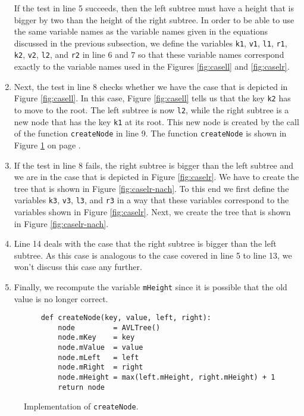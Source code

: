 \begin{enumerate}
      If the test in line 5 succeeds, then the left subtree must have a height that is bigger by
      two than the height of the right subtree.  In order to be able to use the same variable names 
      as the variable names given in the equations discussed in the previous subsection, we define
      the variables \texttt{k1}, \texttt{v1}, \texttt{l1}, \texttt{r1}, \texttt{k2}, \texttt{v2}, \texttt{l2},
      and \texttt{r2} in line 6 and 7 so that these variable names correspond exactly to the variable names
      used in the Figures \ref{fig:casell} and \ref{fig:caselr}.
\item Next, the test in line 8 checks whether we have the case that is depicted in Figure
      \ref{fig:casell}.  In this case, Figure \ref{fig:casell} tells us that the key \texttt{k2}
      has to move to the root.  The left subtree is now \texttt{l2}, while the right subtree is a
      new node that has the key \texttt{k1} at its root.  This new node is created by the call
      of the function \texttt{createNode} in line 9.  The function \texttt{createNode} is shown in
      Figure \ref{fig:avl-tree.ipython:createNode} on page \pageref{fig:avl-tree.ipython:createNode}.
\item If the test in line 8 fails, the right subtree is bigger than the left subtree and we are in 
      the case that is depicted in Figure \ref{fig:caselr}.  We have to create the tree that is
      shown in Figure \ref{fig:caselr-nach}.  To this end we first define the variables 
      \texttt{k3}, \texttt{v3}, \texttt{l3}, and \texttt{r3} in a way that these variables
      correspond to the variables shown in Figure \ref{fig:caselr}.  Next, we create the tree
      that is shown in Figure \ref{fig:caselr-nach}.
\item Line 14 deals with the case that the right subtree is bigger than the left subtree. 
      As this case is analogous to the case covered in line 5 to line 13, we won't discuss this case
      any further.
\item Finally, we recompute the variable \texttt{mHeight} since it is possible that the old value is
      no longer correct.
\end{enumerate}


\begin{figure}[!ht]
\centering
\begin{verbatim}
    def createNode(key, value, left, right):
        node         = AVLTree()
        node.mKey    = key
        node.mValue  = value
        node.mLeft   = left
        node.mRight  = right
        node.mHeight = max(left.mHeight, right.mHeight) + 1
        return node
\end{verbatim}
\vspace*{-0.3cm}
\caption{Implementation of \texttt{createNode}.}
\label{fig:avl-tree.ipython:createNode}
\end{figure}


